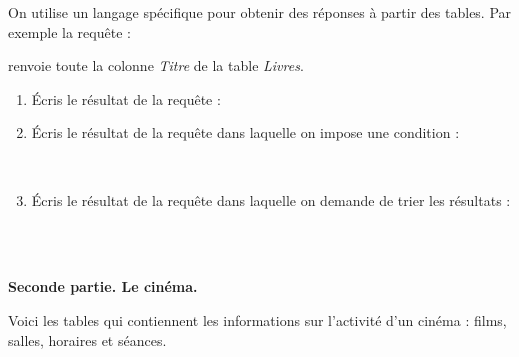 \documentclass[class=report,crop=false, 12pt]{standalone}
\begin{document}
\begin{activite}

On utilise un langage spécifique pour obtenir des réponses à partir des tables.
Par exemple la requête :

  \indentation{}

renvoie toute la colonne \emph{Titre} de la table \emph{Livres}.
  
  
 \begin{enumerate}
  \item  Écris le résultat de la requête :
  
  \indentation{}
    
  \item Écris le résultat de la requête dans laquelle on impose une condition :
  
  \indentation{}\\
  \indentation\indentation{}
   
  \item Écris le résultat de la requête dans laquelle on demande de trier les résultats :
  
  \indentation{}\\
  \indentation\indentation{}\\
  \indentation\indentation{}    
  
  
\end{enumerate}

\end{activite}


\bigskip
\textbf{Seconde partie. Le cinéma.}


Voici les tables qui contiennent les informations sur l'activité d'un cinéma : films, salles, horaires et séances.

\bigskip
\end{document}
